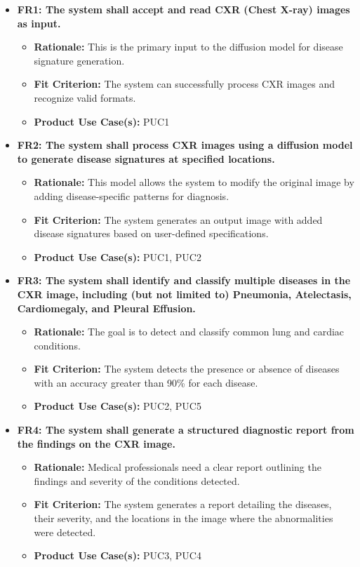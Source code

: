 \documentclass[12pt]{article}
\begin{document}
\begin{itemize}
    \item \textbf{FR1: The system shall accept and read CXR (Chest X-ray) images as input.}
    \begin{itemize}
        \item \textbf{Rationale:} This is the primary input to the diffusion model for disease signature generation.
        \item \textbf{Fit Criterion:} The system can successfully process CXR images and recognize valid formats.
        \item \textbf{Product Use Case(s):} PUC1
    \end{itemize}
    
    \item \textbf{FR2: The system shall process CXR images using a diffusion model to generate disease signatures at specified locations.}
    \begin{itemize}
        \item \textbf{Rationale:} This model allows the system to modify the original image by adding disease-specific patterns for diagnosis.
        \item \textbf{Fit Criterion:} The system generates an output image with added disease signatures based on user-defined specifications.
        \item \textbf{Product Use Case(s):} PUC1, PUC2
    \end{itemize}
    
    \item \textbf{FR3: The system shall identify and classify multiple diseases in the CXR image, including (but not limited to) Pneumonia, Atelectasis, Cardiomegaly, and Pleural Effusion.}
    \begin{itemize}
        \item \textbf{Rationale:} The goal is to detect and classify common lung and cardiac conditions.
        \item \textbf{Fit Criterion:} The system detects the presence or absence of diseases with an accuracy greater than 90\% for each disease.
        \item \textbf{Product Use Case(s):} PUC2, PUC5
    \end{itemize}
    
    \item \textbf{FR4: The system shall generate a structured diagnostic report from the findings on the CXR image.}
    \begin{itemize}
        \item \textbf{Rationale:} Medical professionals need a clear report outlining the findings and severity of the conditions detected.
        \item \textbf{Fit Criterion:} The system generates a report detailing the diseases, their severity, and the locations in the image where the abnormalities were detected.
        \item \textbf{Product Use Case(s):} PUC3, PUC4
    \end{itemize}
    

\end{itemize}
\end{document}
